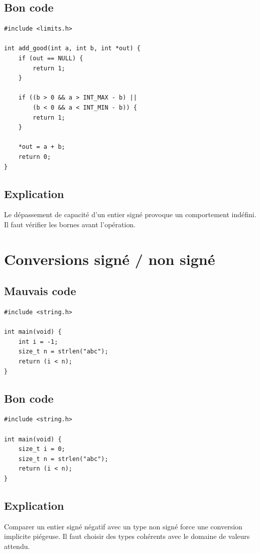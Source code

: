 \documentclass[a4paper,11pt]{report}
\begin{document}
\section{Bon code}
\begin{lstlisting}
#include <limits.h>

int add_good(int a, int b, int *out) {
    if (out == NULL) {
        return 1;
    }

    if ((b > 0 && a > INT_MAX - b) ||
        (b < 0 && a < INT_MIN - b)) {
        return 1;
    }

    *out = a + b;
    return 0;
}
\end{lstlisting}

\section{Explication}
Le dépassement de capacité d'un entier signé provoque un comportement indéfini.
Il faut vérifier les bornes avant l'opération.

\chapter{Conversions signé / non signé}

\section{Mauvais code}
\begin{lstlisting}
#include <string.h>

int main(void) {
    int i = -1;
    size_t n = strlen("abc");
    return (i < n);
}
\end{lstlisting}

\section{Bon code}
\begin{lstlisting}
#include <string.h>

int main(void) {
    size_t i = 0;
    size_t n = strlen("abc");
    return (i < n);
}
\end{lstlisting}

\section{Explication}
Comparer un entier signé négatif avec un type non signé force une conversion implicite piégeuse.
Il faut choisir des types cohérents avec le domaine de valeurs attendu.
\end{document}
